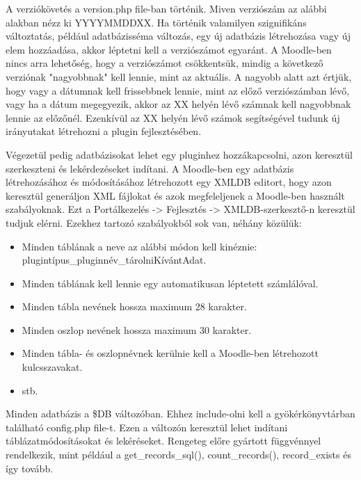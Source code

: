 A verziókövetés a version.php file-ban történik. Miven verziószám az alábbi alakban nézz ki YYYYMMDDXX. Ha történik valamilyen szignifikáns változtatás, például adatbázisséma változás, egy új adatbázis létrehozása vagy új elem hozzáadása, akkor léptetni kell a verziószámot egyaránt. A Moodle-ben nincs arra lehetőség, hogy a verziószámot csökkentsük, mindig a következő verziónak "nagyobbnak" kell lennie, mint az aktuális. A nagyobb alatt azt értjük, hogy vagy a dátumnak kell frissebbnek lennie, mint az előző verziószámban lévő, vagy ha a dátum megegyezik, akkor az XX helyén lévő számnak kell nagyobbnak lennie az előzőnél. Ezenkívül az XX helyén lévő számok segítségével tudunk új irányutakat létrehozni a plugin fejlesztésében. \par

Végezetül pedig adatbázisokat lehet egy pluginhez hozzákapcsolni, azon keresztül szerkeszteni és lekérdezéseket indítani. A Moodle-ben egy adatbázis létrehozásához és módosításához létrehozott egy XMLDB editort, hogy azon keresztül generáljon XML fájlokat és azok megfeleljenek a Moodle-ben használt szabályoknak. Ezt a Portálkezelés -> Fejlesztés -> XMLDB-szerkesztő-n keresztül tudjuk elérni. Ezekhez tartozó szabályokból sok van, néhány közülük:

\begin{itemize}
    \item Minden táblának a neve az alábbi módon kell kinéznie: plugintípus\_pluginnév\_tárolniKívántAdat.
    \item Minden táblának kell lennie egy automatikusan léptetett számlálóval.
    \item Minden tábla nevének hossza maximum 28 karakter.
    \item Minden oszlop nevének hossza maximum 30 karakter.
    \item Minden tábla- és oszlopnévnek kerülnie kell a Moodle-ben létrehozott kulcsszavakat.
    \item stb.
\end{itemize}

Minden adatbázis a \$DB változóban. Ehhez include-olni kell a gyökérkönyvtárban található config.php file-t. Ezen a változón keresztül lehet indítani táblázatmódosításokat és lekéréseket. Rengeteg előre gyártott függvénnyel rendelkezik, mint például a get\_records\_sql(), count\_records(), record\_exists és így tovább. 
